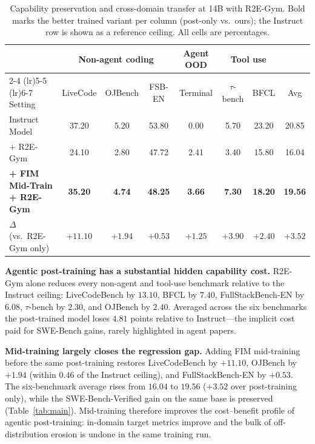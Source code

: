 \begin{table}[t]
\centering
\caption{Capability preservation and cross-domain transfer at 14B with
R2E-Gym. Bold marks the better trained variant per column (post-only
vs.\ ours); the Instruct row is shown as a reference ceiling. All cells
are percentages.}
\label{tab:cap}
\small
\setlength{\tabcolsep}{4pt}
\begin{tabular}{lcccccc|c}
\toprule
& \multicolumn{3}{c}{Non-agent coding}
& \multicolumn{1}{c}{Agent OOD}
& \multicolumn{2}{c}{Tool use}
& \\
\cmidrule(lr){2-4} \cmidrule(lr){5-5} \cmidrule(lr){6-7}
Setting
& LiveCode & OJBench & FSB-EN
& Terminal
& $\tau$-bench & BFCL
& Avg \\
\midrule
Instruct Model
  & 37.20 & 5.20 & 53.80
  & 0.00
  & 5.70 & 23.20
  & 20.85 \\
+ R2E-Gym
  & 24.10 & 2.80 & 47.72
  & 2.41
  & 3.40 & 15.80
  & 16.04 \\
\textbf{+ FIM Mid-Train + R2E-Gym}
  & \textbf{35.20} & \textbf{4.74} & \textbf{48.25}
  & \textbf{3.66}
  & \textbf{7.30} & \textbf{18.20}
  & \textbf{19.56} \\
\rowcolor{blue!8}
$\Delta$ (vs.\ R2E-Gym only)
  & $+11.10$ & $+1.94$ & $+0.53$
  & $+1.25$
  & $+3.90$ & $+2.40$
  & $+3.52$ \\
\bottomrule
\end{tabular}
\end{table}

\textbf{Agentic post-training has a substantial hidden capability cost.}
R2E-Gym alone reduces every non-agent and tool-use benchmark relative to
the Instruct ceiling: LiveCodeBench by $13.10$, BFCL by $7.40$,
FullStackBench-EN by $6.08$, $\tau$-bench by $2.30$, and OJBench by
$2.40$. Averaged across the six benchmarks the post-trained model loses
$4.81$ points relative to Instruct---the implicit cost paid for
SWE-Bench gains, rarely highlighted in agent papers.

\textbf{Mid-training largely closes the regression gap.}
Adding FIM mid-training before the same post-training restores
LiveCodeBench by $+11.10$, OJBench by $+1.94$ (within $0.46$ of the
Instruct ceiling), and FullStackBench-EN by $+0.53$. The six-benchmark
average rises from $16.04$ to $19.56$ ($+3.52$ over post-training only),
while the SWE-Bench-Verified gain on the same base is preserved
(Table~\ref{tab:main}). Mid-training therefore improves the
cost--benefit profile of agentic post-training: in-domain target
metrics improve and the bulk of off-distribution erosion is undone in
the same training run.

